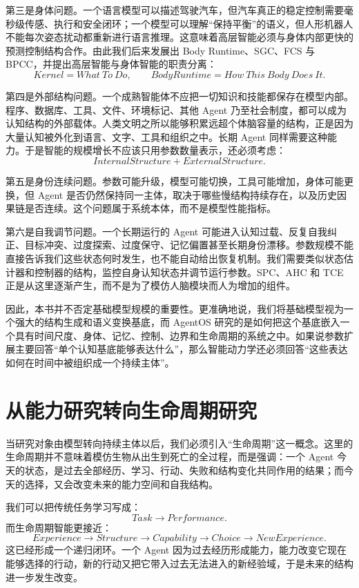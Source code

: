 第三是身体问题。一个语言模型可以描述驾驶汽车，但汽车真正的稳定控制需要毫秒级传感、执行和安全闭环；一个模型可以理解“保持平衡”的语义，但人形机器人不能每次姿态扰动都重新进行语言推理。这意味着高层智能必须与身体内部更快的预测控制结构合作。由此我们后来发展出 Body Runtime、SGC、FCS 与 BPCC，并提出高层智能与身体智能的职责分离：
\[
Kernel = What\ To\ Do,
\qquad
BodyRuntime = How\ This\ Body\ Does\ It.
\]

第四是外部结构问题。一个成熟智能体不应把一切知识和技能都保存在模型内部。程序、数据库、工具、文件、环境标记、其他 Agent 乃至社会制度，都可以成为认知结构的外部载体。人类文明之所以能够积累远超个体脑容量的结构，正是因为大量认知被外化到语言、文字、工具和组织之中。长期 Agent 同样需要这种能力。于是智能的规模增长不应该只用参数数量表示，还必须考虑：
\[
InternalStructure
+
ExternalStructure.
\]

第五是身份连续问题。参数可能升级，模型可能切换，工具可能增加，身体可能更换，但 Agent 是否仍然保持同一主体，取决于哪些慢结构持续存在，以及历史因果链是否连续。这个问题属于系统本体，而不是模型性能指标。

第六是自我调节问题。一个长期运行的 Agent 可能进入认知过载、反复自我纠正、目标冲突、过度探索、过度保守、记忆偏置甚至长期身份漂移。参数规模不能直接告诉我们这些状态何时发生，也不能自动给出恢复机制。我们需要类似状态估计器和控制器的结构，监控自身认知状态并调节运行参数。SPC、AHC 和 TCE 正是从这里逐渐产生，而不是为了模仿人脑模块而人为增加的组件。

因此，本书并不否定基础模型规模的重要性。更准确地说，我们将基础模型视为一个强大的结构生成和语义变换基底，而 AgentOS 研究的是如何把这个基底嵌入一个具有时间尺度、身体、记忆、控制、边界和生命周期的系统之中。如果说参数扩展主要回答“单个认知基底能够表达什么”，那么智能动力学还必须回答“这些表达如何在时间中被组织成一个持续主体”。

\section{从能力研究转向生命周期研究}

当研究对象由模型转向持续主体以后，我们必须引入“生命周期”这一概念。这里的生命周期并不意味着模仿生物从出生到死亡的全过程，而是强调：一个 Agent 今天的状态，是过去全部经历、学习、行动、失败和结构变化共同作用的结果；而今天的选择，又会改变未来的能力空间和自我结构。

我们可以把传统任务学习写成：
\[
Task
\rightarrow
Performance.
\]
而生命周期智能更接近：
\[
Experience
\rightarrow
Structure
\rightarrow
Capability
\rightarrow
Choice
\rightarrow
NewExperience.
\]
这已经形成一个递归闭环。一个 Agent 因为过去经历形成能力，能力改变它现在能够选择的行动，新的行动又把它带入过去无法进入的新经验域，于是未来的结构进一步发生改变。

